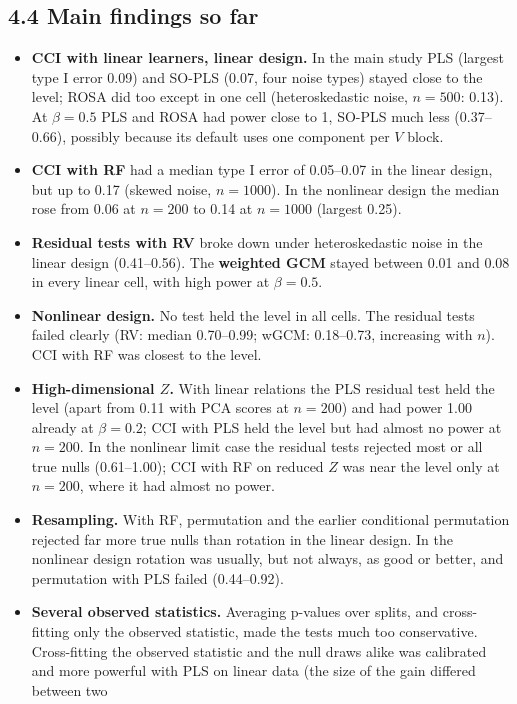 \documentclass[10pt,leqno]{amsart}
\begin{document}
\subsection*{4.4 Main findings so far}
\begin{itemize}
\item \textbf{CCI with linear learners, linear design.} In the main study PLS (largest
  type I error 0.09) and SO-PLS (0.07, four noise types) stayed close to the level;
  ROSA did too except in one cell (heteroskedastic noise, $n=500$: 0.13). At
  $\beta=0.5$ PLS and ROSA had power close to 1, SO-PLS much less (0.37--0.66),
  possibly because its default uses one component per $V$ block.
\item \textbf{CCI with RF} had a median type I error of 0.05--0.07 in the linear design,
  but up to 0.17 (skewed noise, $n=1000$). In the nonlinear design the median rose
  from 0.06 at $n=200$ to 0.14 at $n=1000$ (largest 0.25).
\item \textbf{Residual tests with RV} broke down under heteroskedastic noise in the
  linear design (0.41--0.56). The \textbf{weighted GCM} stayed between 0.01 and 0.08 in
  every linear cell, with high power at $\beta=0.5$.
\item \textbf{Nonlinear design.} No test held the level in all cells. The residual tests
  failed clearly (RV: median 0.70--0.99; wGCM: 0.18--0.73, increasing with $n$). CCI
  with RF was closest to the level.
\item \textbf{High-dimensional $Z$.} With linear relations the PLS residual test held
  the level (apart from 0.11 with PCA scores at $n=200$) and had power 1.00 already
  at $\beta=0.2$; CCI with PLS held the level but had almost no power at $n=200$. In
  the nonlinear limit case the residual tests rejected most or all true nulls
  (0.61--1.00); CCI with RF on reduced $Z$ was near the level only at $n=200$, where it
  had almost no power.
\item \textbf{Resampling.} With RF, permutation and the earlier conditional
  permutation rejected far more true nulls than rotation in the linear design. In the
  nonlinear design rotation was usually, but not always, as good or better, and
  permutation with PLS failed (0.44--0.92).
\item \textbf{Several observed statistics.} Averaging p-values over splits, and
  cross-fitting only the observed statistic, made the tests much too conservative.
  Cross-fitting the observed statistic and the null draws alike was calibrated and
  more powerful with PLS on linear data (the size of the gain differed between two

\end{itemize}
\end{document}
